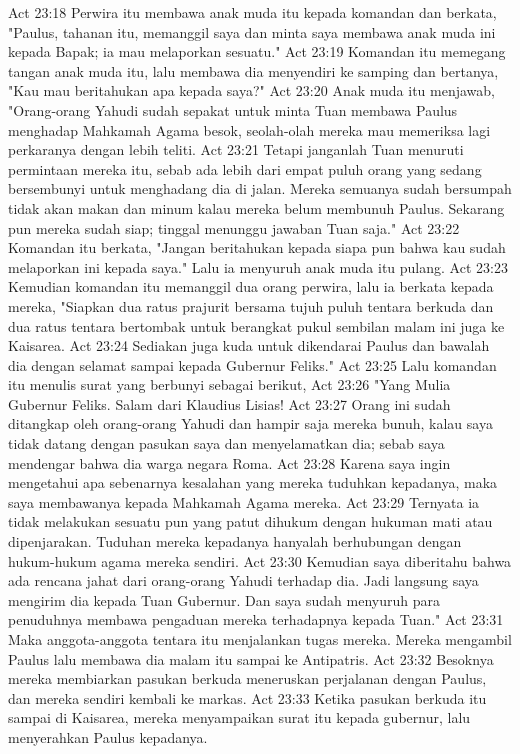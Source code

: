 Act 23:18  Perwira itu membawa anak muda itu kepada komandan dan berkata, "Paulus, tahanan itu, memanggil saya dan minta saya membawa anak muda ini kepada Bapak; ia mau melaporkan sesuatu."
Act 23:19  Komandan itu memegang tangan anak muda itu, lalu membawa dia menyendiri ke samping dan bertanya, "Kau mau beritahukan apa kepada saya?"
Act 23:20  Anak muda itu menjawab, "Orang-orang Yahudi sudah sepakat untuk minta Tuan membawa Paulus menghadap Mahkamah Agama besok, seolah-olah mereka mau memeriksa lagi perkaranya dengan lebih teliti.
Act 23:21  Tetapi janganlah Tuan menuruti permintaan mereka itu, sebab ada lebih dari empat puluh orang yang sedang bersembunyi untuk menghadang dia di jalan. Mereka semuanya sudah bersumpah tidak akan makan dan minum kalau mereka belum membunuh Paulus. Sekarang pun mereka sudah siap; tinggal menunggu jawaban Tuan saja."
Act 23:22  Komandan itu berkata, "Jangan beritahukan kepada siapa pun bahwa kau sudah melaporkan ini kepada saya." Lalu ia menyuruh anak muda itu pulang.
Act 23:23  Kemudian komandan itu memanggil dua orang perwira, lalu ia berkata kepada mereka, "Siapkan dua ratus prajurit bersama tujuh puluh tentara berkuda dan dua ratus tentara bertombak untuk berangkat pukul sembilan malam ini juga ke Kaisarea.
Act 23:24  Sediakan juga kuda untuk dikendarai Paulus dan bawalah dia dengan selamat sampai kepada Gubernur Feliks."
Act 23:25  Lalu komandan itu menulis surat yang berbunyi sebagai berikut,
Act 23:26  "Yang Mulia Gubernur Feliks. Salam dari Klaudius Lisias!
Act 23:27  Orang ini sudah ditangkap oleh orang-orang Yahudi dan hampir saja mereka bunuh, kalau saya tidak datang dengan pasukan saya dan menyelamatkan dia; sebab saya mendengar bahwa dia warga negara Roma.
Act 23:28  Karena saya ingin mengetahui apa sebenarnya kesalahan yang mereka tuduhkan kepadanya, maka saya membawanya kepada Mahkamah Agama mereka.
Act 23:29  Ternyata ia tidak melakukan sesuatu pun yang patut dihukum dengan hukuman mati atau dipenjarakan. Tuduhan mereka kepadanya hanyalah berhubungan dengan hukum-hukum agama mereka sendiri.
Act 23:30  Kemudian saya diberitahu bahwa ada rencana jahat dari orang-orang Yahudi terhadap dia. Jadi langsung saya mengirim dia kepada Tuan Gubernur. Dan saya sudah menyuruh para penuduhnya membawa pengaduan mereka terhadapnya kepada Tuan."
Act 23:31  Maka anggota-anggota tentara itu menjalankan tugas mereka. Mereka mengambil Paulus lalu membawa dia malam itu sampai ke Antipatris.
Act 23:32  Besoknya mereka membiarkan pasukan berkuda meneruskan perjalanan dengan Paulus, dan mereka sendiri kembali ke markas.
Act 23:33  Ketika pasukan berkuda itu sampai di Kaisarea, mereka menyampaikan surat itu kepada gubernur, lalu menyerahkan Paulus kepadanya.
